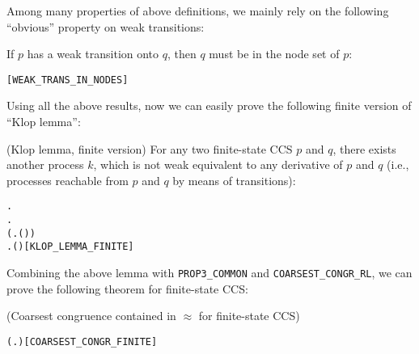 Among many properties of above definitions, we mainly rely on the
following ``obvious'' property on weak transitions:
\begin{proposition}
If $p$ has a weak transition onto $q$, then $q$ must be in the node set of $p$:
\begin{alltt}
\HOLTokenTurnstile{}  \HOLTokenWeakTransBegin{}\HOLTokenWeakTransEnd {} \HOLSymConst{\HOLTokenImp{}}  \HOLSymConst{\HOLTokenIn{}}  \hfill[WEAK_TRANS_IN_NODES]
\end{alltt}
\end{proposition}

Using all the above results, now we can easily prove the following finite
version of ``Klop lemma'':
\begin{lemma}{(Klop lemma,  finite version)}
\label{lem:klop-lemma-finite}
For any two finite-state CCS $p$ and $q$, there exists another process $k$, which
is not weak equivalent to any derivative  of $p$
and $q$ (i.e., processes reachable from $p$ and $q$ by means of transitions):
\begin{alltt}
\HOLTokenTurnstile{} \HOLSymConst{\HOLTokenForall{}} .
         \HOLSymConst{\HOLTokenConj{}}   \HOLSymConst{\HOLTokenImp{}}
       \HOLSymConst{\HOLTokenExists{}}.
             \HOLSymConst{\HOLTokenConj{}} (\HOLSymConst{\HOLTokenForall{}} .  \HOLTokenWeakTransBegin{}\HOLTokenWeakTransEnd {} \HOLSymConst{\HOLTokenImp{}} \HOLSymConst{\HOLTokenNeg{}}( \HOLSymConst{\HOLTokenWeakEQ} )) \HOLSymConst{\HOLTokenConj{}}
           \HOLSymConst{\HOLTokenForall{}} .  \HOLTokenWeakTransBegin{}\HOLTokenWeakTransEnd {} \HOLSymConst{\HOLTokenImp{}} \HOLSymConst{\HOLTokenNeg{}}( \HOLSymConst{\HOLTokenWeakEQ} )\hfill{[KLOP_LEMMA_FINITE]}
\end{alltt}
\end{lemma}

Combining the above lemma with \texttt{PROP3_COMMON} and \texttt{COARSEST_CONGR_RL},
we can  prove the following theorem for finite-state CCS:
\begin{theorem}{(Coarsest congruence contained in $\approx$ for
    finite-state CCS)}
\begin{alltt}
\HOLTokenTurnstile{}   \HOLSymConst{\HOLTokenConj{}}   \HOLSymConst{\HOLTokenImp{}}
   ( \HOLSymConst{\HOLTokenObsCongr}  \HOLSymConst{\HOLTokenEquiv{}} \HOLSymConst{\HOLTokenForall{}}.  \HOLSymConst{\ensuremath{+}}  \HOLSymConst{\HOLTokenWeakEQ}  \HOLSymConst{\ensuremath{+}} )\hfill[COARSEST_CONGR_FINITE]
\end{alltt}
\end{theorem}

